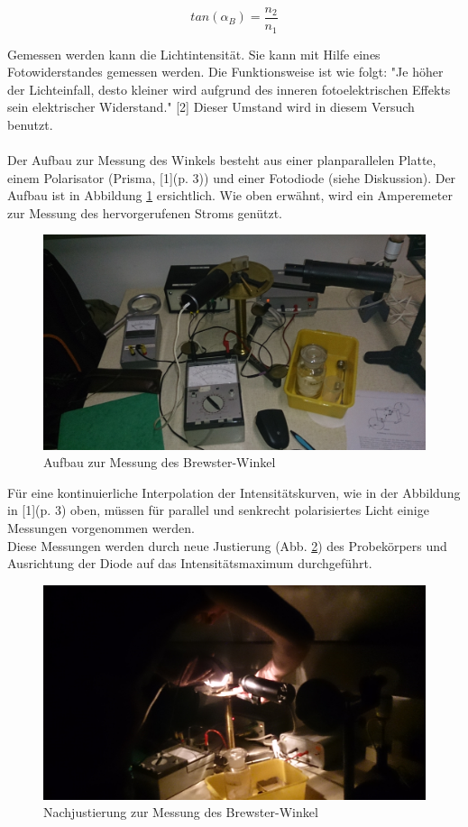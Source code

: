 \documentclass[12pt,a4paper]{article}
\begin{document}
\begin{multicols}{2}
$$tan(\alpha_B) = \frac{n_2}{n_1}$$

\noindent
Gemessen werden kann die Lichtintensität. Sie kann mit Hilfe eines Fotowiderstandes gemessen werden. Die Funktionsweise ist wie folgt: "Je höher der Lichteinfall, desto kleiner wird aufgrund des inneren fotoelektrischen Effekts sein elektrischer Widerstand." [2] Dieser Umstand wird in diesem Versuch benutzt.\\
\\
Der Aufbau zur Messung des Winkels besteht aus einer planparallelen Platte, einem Polarisator (Prisma, [1](p. 3)) und einer Fotodiode (siehe Diskussion). Der Aufbau ist in Abbildung \ref{fig:brewster_aufbau} ersichtlich. Wie oben erwähnt, wird ein Amperemeter zur Messung des hervorgerufenen Stroms genützt.

\begin{figure}[H]
	\centering
	\includegraphics[scale=0.055]{./data/PS5_1_Aufbau.jpg}
	\caption{Aufbau zur Messung des Brewster-Winkel}
	\label{fig:brewster_aufbau}
\end{figure}

\noindent
Für eine kontinuierliche Interpolation der Intensitätskurven, wie in der Abbildung in [1](p. 3) oben, müssen für parallel und senkrecht polarisiertes Licht einige Messungen vorgenommen werden.\\
Diese Messungen werden durch neue Justierung (Abb. \ref{fig:brewster_justierung}) des Probekörpers und Ausrichtung der Diode auf das Intensitätsmaximum durchgeführt.

\begin{figure}[H]
	\centering
	\includegraphics[scale=0.055]{./data/PS5_1_Justierung.jpg}
	\caption{Nachjustierung zur Messung des Brewster-Winkel}
	\label{fig:brewster_justierung}
\end{figure}



\end{multicols}
\end{document}

